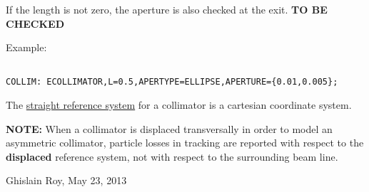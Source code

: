  If the length is not zero, the aperture is also checked at the exit. \textbf{ TO BE CHECKED }

 Example: 
\begin{verbatim}

COLLIM: ECOLLIMATOR,L=0.5,APERTYPE=ELLIPSE,APERTURE={0.01,0.005};
\end{verbatim}  The \href{local_system.html#straight}{straight reference system} for a collimator is a cartesian coordinate system. 

\textbf{NOTE:} When a collimator is displaced transversally in order to model  an asymmetric collimator, particle losses in tracking are reported with respect to the \textbf{displaced} reference system, not with respect to the surrounding beam line.  



 Ghislain Roy, May 23, 2013 

